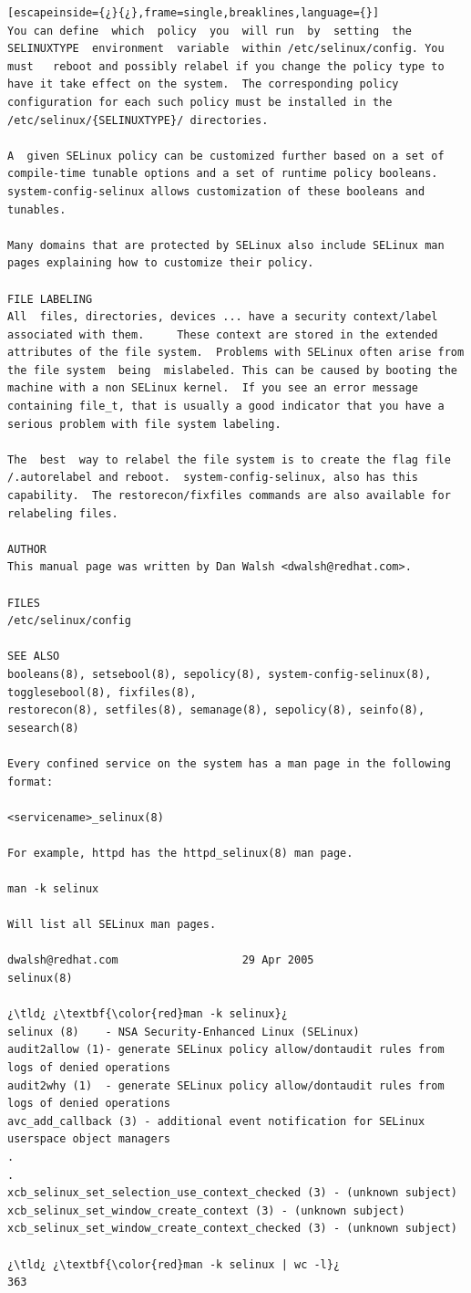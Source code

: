 \begin{lstlisting}[escapeinside={¿}{¿},frame=single,breaklines,language={}]
You can define  which  policy  you  will run  by  setting  the	SELINUXTYPE  environment  variable  within /etc/selinux/config. You  must	reboot and possibly relabel if you change the policy type to have it take effect on the system.  The corresponding policy configuration for each such policy must be installed in the /etc/selinux/{SELINUXTYPE}/ directories.

A  given SELinux policy can be customized further based on a set of compile-time tunable options and a set of runtime policy booleans.  system-config-selinux allows customization of these booleans and tunables.

Many domains that are protected by SELinux also include SELinux man pages explaining how to customize their policy.

FILE LABELING
All  files, directories, devices ... have a security context/label associated with them.	 These context are stored in the extended attributes of the file system.  Problems with SELinux often arise from the file system  being  mislabeled. This can be caused by booting the machine with a non SELinux kernel.  If you see an error message containing file_t, that is usually a good indicator that you have a serious problem with file system labeling.

The  best  way to relabel the file system is to create the flag file /.autorelabel and reboot.  system-config-selinux, also has this capability.  The restorecon/fixfiles commands are also available for relabeling files.

AUTHOR
This manual page was written by Dan Walsh <dwalsh@redhat.com>.

FILES
/etc/selinux/config

SEE ALSO
booleans(8), setsebool(8), sepolicy(8), system-config-selinux(8), togglesebool(8), fixfiles(8),
restorecon(8), setfiles(8), semanage(8), sepolicy(8), seinfo(8), sesearch(8)

Every confined service on the system has a man page in the following format:

<servicename>_selinux(8)

For example, httpd has the httpd_selinux(8) man page.

man -k selinux

Will list all SELinux man pages.

dwalsh@redhat.com				    29 Apr 2005						selinux(8)

¿\tld¿ ¿\textbf{\color{red}man -k selinux}¿
selinux (8)    - NSA Security-Enhanced Linux (SELinux)
audit2allow (1)- generate SELinux policy allow/dontaudit rules from logs of denied operations
audit2why (1)  - generate SELinux policy allow/dontaudit rules from logs of denied operations
avc_add_callback (3) - additional event notification for SELinux userspace object managers
.
.
xcb_selinux_set_selection_use_context_checked (3) - (unknown subject)
xcb_selinux_set_window_create_context (3) - (unknown subject)
xcb_selinux_set_window_create_context_checked (3) - (unknown subject)

¿\tld¿ ¿\textbf{\color{red}man -k selinux | wc -l}¿
363
\end{lstlisting}	

